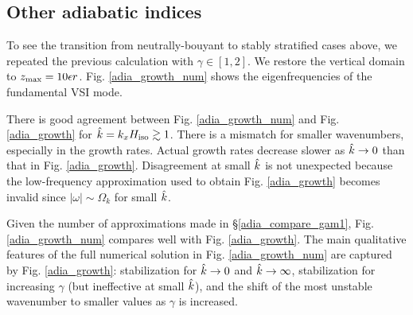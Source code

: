 \subsection{Other adiabatic indices}
To see the transition from neutrally-bouyant to stably stratified cases above, 
we repeated the previous calculation with $\gamma\in[1,2]$. 
We restore the vertical domain to $z_\mathrm{max}=10\epsilon r$. 
Fig. \ref{adia_growth_num} shows the eigenfrequencies of the
fundamental VSI mode. 


There is good agreement between Fig. \ref{adia_growth_num} and
Fig. \ref{adia_growth} for $\hat{k}=k_xH_\mathrm{iso}\gtrsim1$. There is a
mismatch for smaller wavenumbers, especially in the growth
rates. Actual growth rates decrease slower as $\hat{k}\to0$
than that in Fig. \ref{adia_growth}. Disagreement at small
$\hat{k}$ is not unexpected because the low-frequency
approximation used to obtain Fig. \ref{adia_growth} becomes invalid since
$|\omega|\sim\Omega_k$ for small $\hat{k}$.  

Given the number of approximations made in \S\ref{adia_compare_gam1},
Fig. \ref{adia_growth_num} compares well with 
Fig. \ref{adia_growth}. The main qualitative features of the full
numerical solution in Fig. \ref{adia_growth_num} are captured by
Fig. \ref{adia_growth}: stabilization for 
$\hat{k}\to0$ and $\hat{k}\to\infty$,
stabilization for increasing $\gamma$ (but ineffective at small $\hat{k}$), 
and the shift of the most unstable wavenumber to smaller values as
$\gamma$ is increased. 


